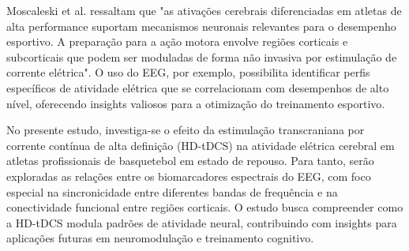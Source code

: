 Moscaleski et al. \cite{moscaleski2022hdtdcs} ressaltam que "as ativações cerebrais diferenciadas em atletas de alta performance suportam mecanismos neuronais relevantes para o desempenho esportivo. A preparação para a ação motora envolve regiões corticais e subcorticais que podem ser moduladas de forma não invasiva por estimulação de corrente elétrica". O uso do EEG, por exemplo, possibilita identificar perfis específicos de atividade elétrica que se correlacionam com desempenhos de alto nível, oferecendo insights valiosos para a otimização do treinamento esportivo.

No presente estudo, investiga-se o efeito da estimulação transcraniana por corrente contínua de alta definição (HD-tDCS) na atividade elétrica cerebral em atletas profissionais de basquetebol em estado de repouso. Para tanto, serão exploradas as relações entre os biomarcadores espectrais do EEG, com foco especial na sincronicidade entre diferentes bandas de frequência e na conectividade funcional entre regiões corticais. O estudo busca compreender como a HD-tDCS modula padrões de atividade neural, contribuindo com insights para aplicações futuras em neuromodulação e treinamento cognitivo.